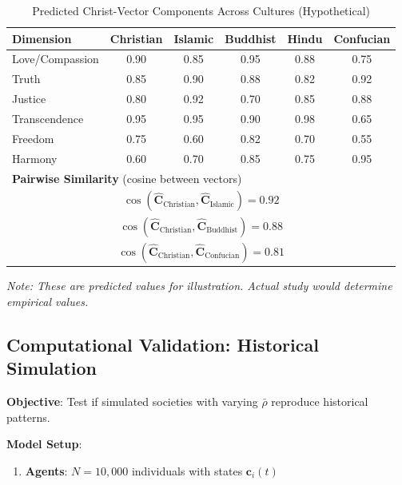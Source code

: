 \documentclass[11pt,a4paper]{article}
\theoremstyle{definition}
\theoremstyle{remark}
\newcommand{\cc}{\mathbf{c}}
\begin{document}
\begin{enumerate}
\begin{table}[H]
\centering
\caption{Predicted Christ-Vector Components Across Cultures (Hypothetical)}
\label{tab:cross_cultural_C}
\begin{tabular}{|l|c|c|c|c|c|}
\hline
\textbf{Dimension} & \textbf{Christian} & \textbf{Islamic} & \textbf{Buddhist} & \textbf{Hindu} & \textbf{Confucian} \\
\hline
Love/Compassion & 0.90 & 0.85 & 0.95 & 0.88 & 0.75 \\
\hline
Truth & 0.85 & 0.90 & 0.88 & 0.82 & 0.92 \\
\hline
Justice & 0.80 & 0.92 & 0.70 & 0.85 & 0.88 \\
\hline
Transcendence & 0.95 & 0.95 & 0.90 & 0.98 & 0.65 \\
\hline
Freedom & 0.75 & 0.60 & 0.82 & 0.70 & 0.55 \\
\hline
Harmony & 0.60 & 0.70 & 0.85 & 0.75 & 0.95 \\
\hline
\multicolumn{6}{|l|}{\textbf{Pairwise Similarity} (cosine between vectors)} \\
\hline
\multicolumn{6}{|c|}{\(\cos(\hat{\mathbf{C}}_{\text{Christian}}, \hat{\mathbf{C}}_{\text{Islamic}}) = 0.92\)} \\
\multicolumn{6}{|c|}{\(\cos(\hat{\mathbf{C}}_{\text{Christian}}, \hat{\mathbf{C}}_{\text{Buddhist}}) = 0.88\)} \\
\multicolumn{6}{|c|}{\(\cos(\hat{\mathbf{C}}_{\text{Christian}}, \hat{\mathbf{C}}_{\text{Confucian}}) = 0.81\)} \\
\hline
\end{tabular}
\end{table}

\textit{Note: These are predicted values for illustration. Actual study would determine empirical values.}

\subsection{Computational Validation: Historical Simulation}

\begin{protocol}
\textbf{Objective}: Test if simulated societies with varying \(\bar{\rho}\) reproduce historical patterns.

\textbf{Model Setup}:
\begin{enumerate}
    \item \textbf{Agents}: \(N = 10{,}000\) individuals with states \(\cc_i(t)\)
    

\end{enumerate}
\end{protocol}
\end{enumerate}
\end{document}
